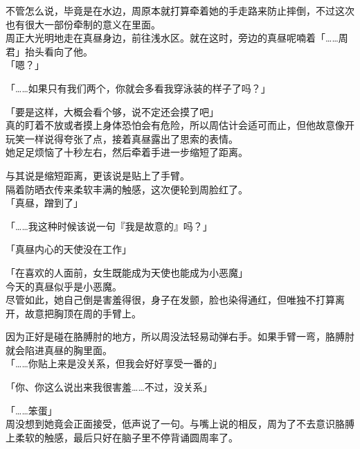 不管怎么说，毕竟是在水边，周原本就打算牵着她的手走路来防止摔倒，不过这次也有很大一部份牵制的意义在里面。\\

周正大光明地走在真昼身边，前往浅水区。就在这时，旁边的真昼呢喃着「……周君」抬头看向了他。\\

「嗯？」

「……如果只有我们两个，你就会多看我穿泳装的样子了吗？」

「要是这样，大概会看个够，说不定还会摸了吧」\\

真的盯着不放或者摸上身体恐怕会有危险，所以周估计会适可而止，但他故意像开玩笑一样说得夸张了点，接着真昼露出了思索的表情。\\

她足足烦恼了十秒左右，然后牵着手进一步缩短了距离。

与其说是缩短距离，更该说是贴上了手臂。\\

隔着防晒衣传来柔软丰满的触感，这次便轮到周脸红了。\\

「真昼，蹭到了」

「……我这种时候该说一句『我是故意的』吗？」

「真昼内心的天使没在工作」

「在喜欢的人面前，女生既能成为天使也能成为小恶魔」\\

今天的真昼似乎是小恶魔。\\

尽管如此，她自己倒是害羞得很，身子在发颤，脸也染得通红，但唯独不打算离开，故意把胸顶在周的手臂上。

因为正好是碰在胳膊肘的地方，所以周没法轻易动弹右手。如果手臂一弯，胳膊肘就会陷进真昼的胸里面。\\

「……你贴上来是没关系，但我会好好享受一番的」

「你、你这么说出来我很害羞……不过，没关系」

「……笨蛋」\\

周没想到她竟会正面接受，低声说了一句。与嘴上说的相反，周为了不去意识胳膊上柔软的触感，最后只好在脑子里不停背诵圆周率了。
